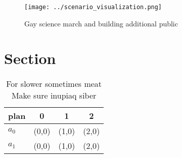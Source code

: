\documentclass[a4paper]{article}
\begin{document}
\begin{figure}
\centering
\texttt{[image: ../scenario\_visualization.png]}
\caption{Gay science march and building additional public 
}
\end{figure}
 
\section{Section}

\begin{table}
\begin{adjustbox}{width=0.5\columnwidth}
\begin{tabular}{|l|l|l|l|}
\hline
\textbf{plan} & \multicolumn{1}{c|}{\textbf{0}} & \multicolumn{1}{c|}{\textbf{1}} & \multicolumn{1}{c|}{\textbf{2}} \\ \hline
\textbf{$a_0$}  & (0,0) & (1,0) & (2,0) \\ \hline
\textbf{$a_1$}  & (0,0) & (1,0) & (2,0) \\ \hline
\end{tabular}
\end{adjustbox}
\caption{For slower sometimes meat Make sure inupiaq siber
}
\end{table}
\end{document}
